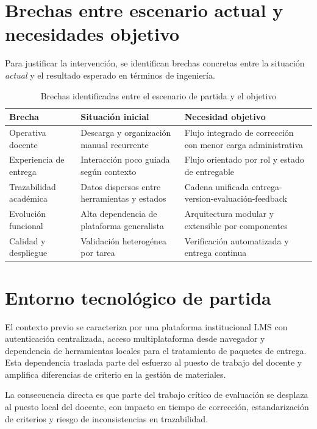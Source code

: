 \FloatBarrier
\section{Brechas entre escenario actual y necesidades objetivo}

Para justificar la intervenci\'on,
se identifican brechas concretas entre la situaci\'on \emph{actual}
y el resultado esperado en t\'erminos de ingenier\'ia.

\begin{table}[!htbp]
\centering
\begin{tabular}{|P{3.2cm}|P{4.4cm}|P{4.9cm}|}
\hline
\textbf{Brecha} & \textbf{Situaci\'on inicial} & \textbf{Necesidad objetivo} \\
\hline
Operativa docente & Descarga y organizaci\'on manual recurrente & Flujo integrado de correcci\'on con menor carga administrativa \\
\hline
Experiencia de entrega & Interacci\'on poco guiada seg\'un contexto & Flujo orientado por rol y estado de entregable \\
\hline
Trazabilidad acad\'emica & Datos dispersos entre herramientas y estados & Cadena unificada entrega-version-evaluaci\'on-feedback \\
\hline
Evoluci\'on funcional & Alta dependencia de plataforma generalista & Arquitectura modular y extensible por componentes \\
\hline
Calidad y despliegue & Validaci\'on heterog\'enea por tarea & Verificaci\'on automatizada y entrega continua \\
\hline
\end{tabular}
\caption{Brechas identificadas entre el escenario de partida y el objetivo}
\label{tab:brechas-antecedentes}
\end{table}

\FloatBarrier
\section{Entorno tecnol\'ogico de partida}

El contexto previo se caracteriza por una plataforma institucional LMS con autenticaci\'on centralizada, acceso multiplataforma desde navegador y dependencia de herramientas locales para el tratamiento de paquetes de entrega. Esta dependencia traslada parte del esfuerzo al puesto de trabajo del docente y amplifica diferencias de criterio en la gesti\'on de materiales.

La consecuencia directa es que parte del trabajo cr\'itico de evaluaci\'on
se desplaza al puesto local del docente,
con impacto en tiempo de correcci\'on,
estandarizaci\'on de criterios
y riesgo de inconsistencias en trazabilidad.

